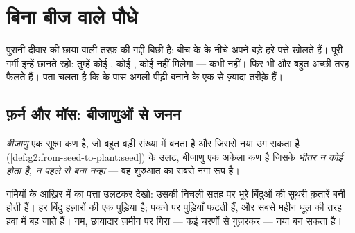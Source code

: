 \chapter{बिना बीज वाले पौधे}\label{ch:g4:plants-without-seeds}

पुरानी दीवार की छाया वाली तरफ़  की गद्दी बिछी है; बीच के  के
नीचे  अपने बड़े हरे पत्ते खोलते हैं। पूरी गर्मी इन्हें छानते रहो:
तुम्हें कोई , कोई , कोई  नहीं मिलेगा --- कभी नहीं। फिर भी 
और  बहुत अच्छी तरह फैलते हैं। पता चलता है कि  के पास अगली
पीढ़ी बनाने के एक से ज़्यादा तरीक़े हैं।

\section{फ़र्न और मॉस: बीजाणुओं से जनन}

\begin{definition}[बीजाणु]\label{def:g4:plants-without-seeds:spore}
\emph{बीजाणु} एक सूक्ष्म कण है, जो बहुत बड़ी संख्या में
बनता है और जिससे नया  उग सकता है। 
(\cref{def:g2:from-seed-to-plant:seed}) के उलट, बीजाणु एक अकेला कण है
जिसके \emph{भीतर न कोई  होता है, न पहले से बना नन्हा }
--- वह शुरुआत का सबसे नंगा रूप है।
\end{definition}

\begin{example}[फ़र्न के पत्तों के नीचे]\label{ex:g4:plants-without-seeds:fern}
गर्मियों के आख़िर में  का पत्ता उलटकर देखो: उसकी निचली सतह पर भूरे
बिंदुओं की सुथरी क़तारें बनी होती हैं। हर बिंदु हज़ारों  की एक
पुड़िया है; पकने पर पुड़ियाँ फटती हैं, और  सबसे महीन धूल की तरह
हवा में बह जाते हैं। नम, छायादार ज़मीन पर गिरा  --- कई चरणों से
गुज़रकर --- नया  बन सकता है।
\end{example}

